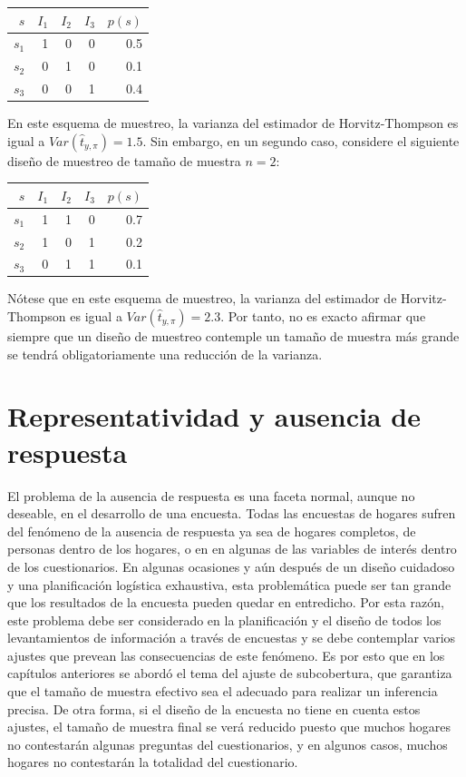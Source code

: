 \documentclass[
  12pt,
]{book}
\begin{document}
\begin{longtable}[]{@{}rrrrr@{}}
\toprule()
\(s\) & \(I_1\) & \(I_2\) & \(I_3\) & \(p(s)\) \\
\midrule()
\endhead
\(s_1\) & 1 & 0 & 0 & 0.5 \\
\(s_2\) & 0 & 1 & 0 & 0.1 \\
\(s_3\) & 0 & 0 & 1 & 0.4 \\
\bottomrule()
\end{longtable}

En este esquema de muestreo, la varianza del estimador de Horvitz-Thompson es igual a \(Var(\hat t_{y, \pi}) = 1.5\). Sin embargo, en un segundo caso, considere el siguiente diseño de muestreo de tamaño de muestra \(n=2\):

\begin{longtable}[]{@{}rrrrr@{}}
\toprule()
\(s\) & \(I_1\) & \(I_2\) & \(I_3\) & \(p(s)\) \\
\midrule()
\endhead
\(s_1\) & 1 & 1 & 0 & 0.7 \\
\(s_2\) & 1 & 0 & 1 & 0.2 \\
\(s_3\) & 0 & 1 & 1 & 0.1 \\
\bottomrule()
\end{longtable}

Nótese que en este esquema de muestreo, la varianza del estimador de Horvitz-Thompson es igual a \(Var(\hat t_{y, \pi}) = 2.3\). Por tanto, no es exacto afirmar que siempre que un diseño de muestreo contemple un tamaño de muestra más grande se tendrá obligatoriamente una reducción de la varianza.

\hypertarget{representatividad-y-ausencia-de-respuesta}{%
\chapter{Representatividad y ausencia de respuesta}\label{representatividad-y-ausencia-de-respuesta}}

El problema de la ausencia de respuesta es una faceta normal, aunque no deseable, en el desarrollo de una encuesta. Todas las encuestas de hogares sufren del fenómeno de la ausencia de respuesta ya sea de hogares completos, de personas dentro de los hogares, o en en algunas de las variables de interés dentro de los cuestionarios. En algunas ocasiones y aún después de un diseño cuidadoso y una planificación logística exhaustiva, esta problemática puede ser tan grande que los resultados de la encuesta pueden quedar en entredicho. Por esta razón, este problema debe ser considerado en la planificación y el diseño de todos los levantamientos de información a través de encuestas y se debe contemplar varios ajustes que prevean las consecuencias de este fenómeno. Es por esto que en los capítulos anteriores se abordó el tema del ajuste de subcobertura, que garantiza que el tamaño de muestra efectivo sea el adecuado para realizar un inferencia precisa. De otra forma, si el diseño de la encuesta no tiene en cuenta estos ajustes, el tamaño de muestra final se verá reducido puesto que muchos hogares no contestarán algunas preguntas del cuestionarios, y en algunos casos, muchos hogares no contestarán la totalidad del cuestionario.
\end{document}

